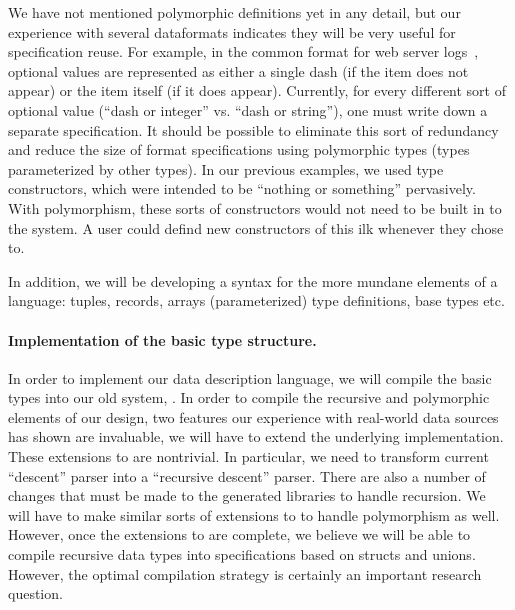 \documentclass[11pt]{article}
\begin{document}
We have not mentioned polymorphic definitions yet in any detail,
but our experience with several dataformats indicates
they will be very useful for specification reuse.  
For example, in the common format for web server logs~\cite{wpp}, optional
values are represented as either a single dash (if the item does not
appear) or the item itself (if it does appear).  Currently, for every
different sort of optional value (\ie ``dash or integer'' vs. ``dash
or string''), one must write down a separate specification.  It should
be possible to eliminate this sort of redundancy and reduce the size
of format specifications using polymorphic types (types parameterized
by other types).  In our previous examples, we used
{} type constructors, which were intended to be
``nothing or something'' pervasively.  With polymorphism,
these sorts of constructors would not need to be built in to the
system.  A user could defind new constructors of this ilk 
whenever they chose to.

In addition, we will be developing a syntax for the more mundane
elements of a language: tuples, records, arrays
(parameterized) type definitions, base types etc.

\paragraph*{Implementation of the basic type structure.}
In order to implement our data description language,
we will compile the basic types into our old system, \pads.
In order to compile the recursive and polymorphic
elements of our design, 
two features our experience with real-world data sources
has shown are invaluable,
we will have to extend the underlying \pads{}
implementation.  These extensions to \pads{}
are nontrivial.  In particular,
we need to transform \pads{} current ``descent'' parser into
a ``recursive descent'' parser.  
There are also a number of changes that must be made to
the generated libraries to handle recursion.  
We will have to make similar sorts of extensions
to \pads{} to handle polymorphism as well.  However,
once the extensions to \pads{} are complete,
we believe we will be able to compile recursive data types
into specifications based on \pads{} structs and unions.
However, the optimal compilation strategy is certainly
an important research question.
\end{document}
